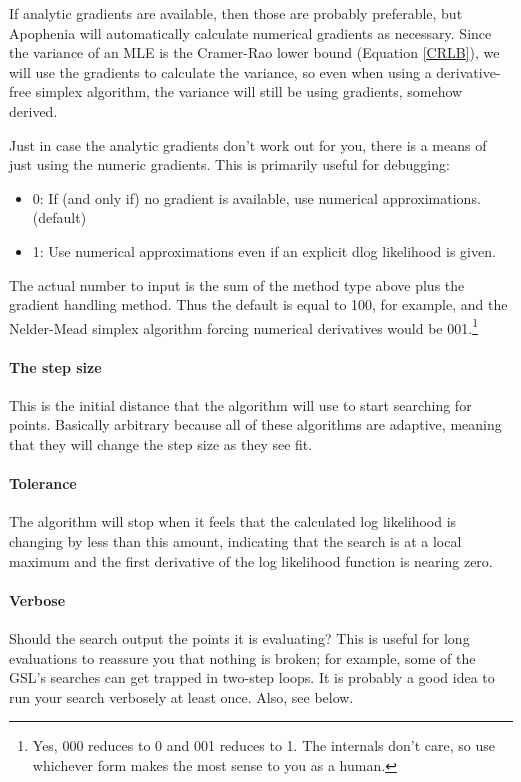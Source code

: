 If analytic gradients are available, then those are probably preferable,
but Apophenia will automatically calculate numerical gradients
as necessary.  Since the variance of an MLE is the Cramer-Rao lower
bound (Equation \ref{CRLB}), we will use the gradients to calculate
the variance, so even when using a derivative-free simplex algorithm,
the variance will still be using gradients, somehow derived.

Just in case the analytic gradients don't work out for you, there is a
means of just using the numeric gradients. This is primarily useful for debugging:

\begin{itemize}
\item 0: If (and only if) no gradient is available, use numerical approximations.  (default)
\item 1: Use numerical approximations even if an explicit dlog likelihood is given. 
\end{itemize}

The actual number to input is the sum of the method type above plus the
gradient handling method. Thus the default is equal to 100, for example, and the
Nelder-Mead simplex algorithm forcing numerical derivatives would be
001.\footnote{Yes, 000 reduces to 0 and 001 reduces to 1. The internals
don't care, so use whichever form makes the most sense to you as a human.}


\paragraph{The step size} This is the initial distance that the
algorithm will use to start searching for points. Basically arbitrary
because all of these algorithms are adaptive, meaning that they will
change the step size as they see fit.

\paragraph{Tolerance} The algorithm will stop when it feels
that the calculated log likelihood is changing by less than this amount,
indicating that the search is at a local maximum and the first derivative of
the log likelihood function is nearing zero.

\paragraph{Verbose} Should the search output the points it is evaluating?
This is useful for long evaluations to reassure you that nothing is
broken; for example, some of the GSL's searches can get trapped in two-step loops.
It is probably a good idea to run your search verbosely at least once.
Also, see  below.

